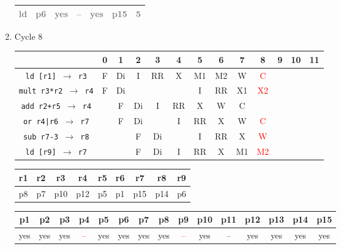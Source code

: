 \documentclass[12pt]{article}
\begin{document}
\begin{enumerate}
\begin{table}[H]
\begin{tabular}{|c|c|c|c|c|c|c|}
					\hline
					\textcolor{gray}{ld} & \textcolor{gray}{p6} & \textcolor{gray}{yes} & \textcolor{gray}{--} & \textcolor{gray}{yes} & \textcolor{gray}{p15} & \textcolor{gray}{5}\\
					\hline
				\end{tabular}
			\end{table}
		\item
			Cycle 8
			\begin{table}[H]
				\begin{tabular}{|c|c|c|c|c|c|c|c|c|c|c|c|c|}
					\hline
					 & 0 & 1 & 2 & 3 & 4 & 5 & 6 & 7 & 8 & 9 & 10 & 11\\
					\hline
					\texttt{ld [r1] $\rightarrow$ r3} & F & Di & I & RR & X & M1 & M2 & W & \textcolor{red}{C} &  &  &\\
					\hline
					\texttt{mult r3*r2 $\rightarrow$ r4} & F & Di &  &  &  & I & RR & X1 & \textcolor{red}{X2} &  &  &\\
					\hline
					\texttt{add r2+r5 $\rightarrow$ r4} &  & F & Di & I & RR & X & W & C &  &  &  &\\
					\hline
					\texttt{or r4|r6 $\rightarrow$ r7} &  & F & Di &  & I & RR & X & W & \textcolor{red}{C} &  &  &\\
					\hline
					\texttt{sub r7-3 $\rightarrow$ r8} &  &  & F & Di &  & I & RR & X & \textcolor{red}{W} &  &  &\\
					\hline
					\texttt{ld [r9] $\rightarrow$ r7} &  &  & F & Di & I & RR & X & M1 & \textcolor{red}{M2} &  &  &\\
					\hline 
				\end{tabular}
			\end{table}
			\begin{table}[H]
				\begin{tabular}{|c|c|c|c|c|c|c|c|c|}
					\hline
					r1 & r2 & r3 & r4 & r5 & r6 & r7 & r8 & r9\\
					\hline
					p8 & p7 & p10 & p12 & p5 & p1 & p15 & p14 & p6\\
					\hline
				\end{tabular}
			\end{table}
			\begin{table}[H]
				\begin{tabular}{|c|c|c|c|c|c|c|c|c|c|c|c|c|c|c|}
					\hline
					p1 & p2 & p3 & p4 & p5 & p6 & p7 & p8 & p9 & p10 & p11 & p12 & p13 & p14 & p15\\
					\hline
					yes & yes & yes & \textcolor{red}{--} & yes & yes & yes & yes & \textcolor{red}{--} & yes & -- & yes & yes & yes & yes\\

\end{tabular}
\end{table}
\end{enumerate}
\end{document}
